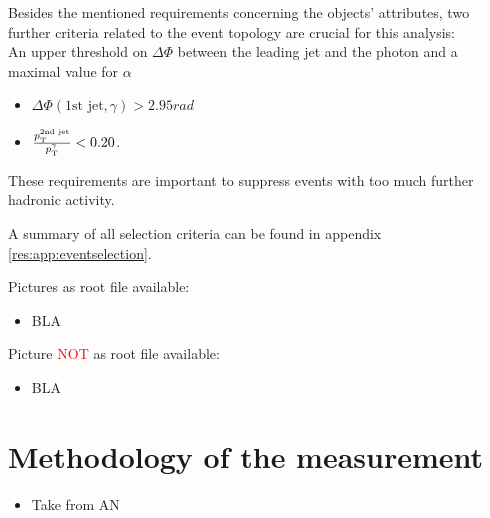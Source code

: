 Besides the mentioned requirements concerning the objects' attributes, two further criteria related to the event topology are crucial for this analysis:\\
An upper threshold on $\Delta \Phi$ between the leading jet and 
the photon and a maximal value for $\alpha$
\begin{itemize}

 \item $\Delta \Phi \left(\text{1st jet}, \gamma \right) > 2.95\unit{rad}$
 \item $\frac{p_{\text{T}}^{\text{2nd jet}}}{p_{\text{T}}^{\gamma}} < 0.20$.

\end{itemize}
These requirements are important to suppress events with too much further hadronic activity.

A summary of all selection criteria can be found in appendix \ref{res:app:eventselection}.


Pictures as root file available:
\begin{itemize}
\item BLA
\end{itemize}

Picture \textcolor{red}{NOT} as root file available:
\begin{itemize}
\item BLA
\end{itemize}

\chapter{Methodology of the measurement}

\begin{itemize}
\item Take from AN
\end{itemize}

